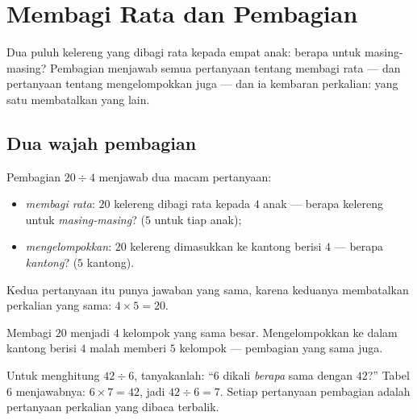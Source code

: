 \chapter{Membagi Rata dan Pembagian}\label{ch:g3:division}

Dua puluh kelereng yang dibagi rata kepada empat anak: berapa untuk
masing-masing? Pembagian menjawab semua pertanyaan tentang membagi
rata --- dan pertanyaan tentang mengelompokkan juga --- dan ia
kembaran perkalian: yang satu membatalkan yang lain.

\section{Dua wajah pembagian}

\begin{definition}[Pembagian]\label{def:g3:division:def}
Pembagian $20 \div 4$ menjawab dua macam pertanyaan:
\begin{itemize}
  \item \emph{membagi rata}: $20$ kelereng dibagi rata kepada $4$
        anak --- berapa kelereng untuk \emph{masing-masing}? ($5$
        untuk tiap anak);
  \item \emph{mengelompokkan}: $20$ kelereng dimasukkan ke kantong
        berisi $4$ --- berapa \emph{kantong}? ($5$ kantong).
\end{itemize}
Kedua pertanyaan itu punya jawaban yang sama, karena keduanya
membatalkan perkalian yang sama: $4 \times 5 = 20$.
\end{definition}

\begin{omfigure}

{\small Membagi $20$ menjadi $4$ kelompok yang sama besar.
Mengelompokkan ke dalam kantong berisi $4$ malah memberi $5$
kelompok --- pembagian yang sama juga.}
\end{omfigure}

\begin{method}\label{met:g3:division:tables}
Untuk menghitung $42 \div 6$, tanyakanlah: ``$6$ dikali \emph{berapa}
sama dengan $42$?'' Tabel $6$ menjawabnya: $6 \times 7 = 42$, jadi
$42 \div 6 = 7$. Setiap pertanyaan pembagian adalah pertanyaan
perkalian yang dibaca terbalik.
\end{method}

